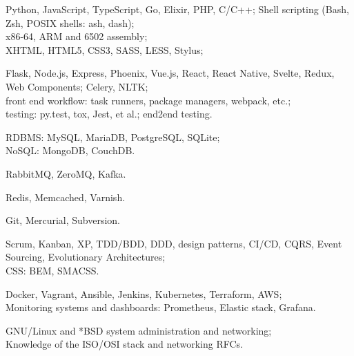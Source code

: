 \documentclass{resume}
\begin{document}
\begin{skillssection}
        {Python, JavaScript, TypeScript, Go, Elixir, PHP, C/C++; Shell
            scripting (Bash, Zsh, POSIX shells: ash, dash);\\%
            x86-64, ARM and 6502 assembly;\\%
            XHTML, HTML5, CSS3, SASS, LESS, Stylus;}

        {Flask, Node.js, Express, Phoenix, Vue.js, React, React Native, Svelte,
            Redux, Web Components; Celery, NLTK;\\%
            front end workflow: task runners, package managers, webpack,
            etc.;\\%
            testing: py.test, tox, Jest, et al.; end2end testing.}

        {RDBMS: MySQL, MariaDB, PostgreSQL, SQLite;\\%
            NoSQL: MongoDB, CouchDB.}

        {RabbitMQ, ZeroMQ, Kafka.}

        {Redis, Memcached, Varnish.}

        {Git, Mercurial, Subversion.}

        {Scrum, Kanban, XP, TDD/BDD, DDD, design patterns, CI/CD, CQRS, Event
            Sourcing, Evolutionary Architectures;\\%
            CSS: BEM, SMACSS.}

        {Docker, Vagrant, Ansible, Jenkins, Kubernetes, Terraform, AWS;\\%
            Monitoring systems and dashboards: Prometheus, Elastic stack,
            Grafana.}

        {GNU/Linux and *BSD system administration and networking;\\%
            Knowledge of the ISO/OSI stack and networking RFCs.}
\end{skillssection}
\end{document}
